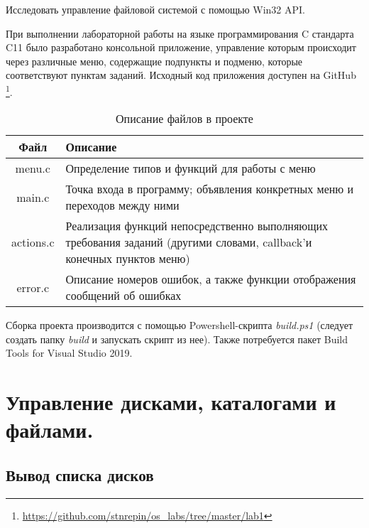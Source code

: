 \documentclass[a4paper,14pt]{extarticle}
\newcommand{\Code}[1]{\textit{#1}}
\begin{document}


\renewcommand*{\thepage}{}
\tableofcontents
\clearpage
\renewcommand*{\thepage}{\arabic{page}}

\setcounter{page}{3}


Исследовать управление файловой системой с помощью Win32 API.


При выполнении лабораторной работы на языке программирования C стандарта C11
было разработано консольной приложение, управление которым происходит через
различные меню, содержащие подпункты и подменю, которые соответствуют пунктам
заданий. Исходный код приложения доступен на GitHub
\footnote{\url{https://github.com/stnrepin/os_labs/tree/master/lab1}}.

\begin{table}[H]
    \centering
    \caption{Описание файлов в проекте}
    \begin{tabularx}{\textwidth}{|c|X|}
        \hline
        Файл & Описание \\
        \hline
        menu.c & Определение типов и функций для работы с меню \\
        \hline
        main.c & Точка входа в программу; объявления конкретных меню и
                    переходов между ними \\
        \hline
        actions.c & Реализация функций непосредственно выполняющих требования
                    заданий (другими словами, callback'и конечных пунктов меню)
                    \\
        \hline
        error.c & Описание номеров ошибок, а также функции отображения
                    сообщений об ошибках \\
        \hline
    \end{tabularx}
\end{table}

Сборка проекта производится с помощью Powershell-скрипта \Code{build.ps1}
(следует создать папку \Code{build} и запускать скрипт из нее). Также
потребуется пакет Build Tools for Visual Studio 2019.


\section{Управление дисками, каталогами и файлами.}


\subsection{Вывод списка дисков}
\end{document}
